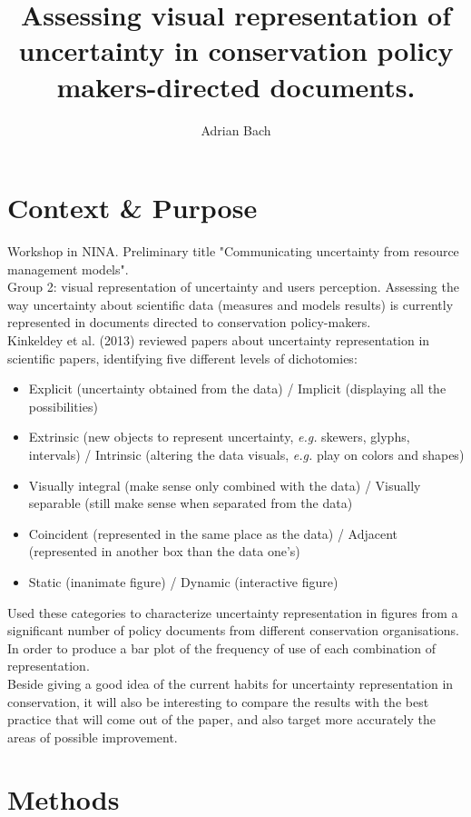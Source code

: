 \documentclass[12pt,a4paper]{article}
\author{Adrian Bach}
\title{Assessing visual representation of uncertainty in conservation policy makers-directed documents.}
\begin{document}
\maketitle

\tableofcontents

\section{Context \& Purpose}

Workshop in NINA.
Preliminary title "Communicating uncertainty from resource management models".\\
Group 2: visual representation of uncertainty and users perception.
Assessing the way uncertainty about scientific data (measures and models results) is currently represented in documents directed to conservation policy-makers.\\
Kinkeldey et al. (2013) reviewed papers about uncertainty representation in scientific papers, identifying five different levels of dichotomies:
\begin{itemize}
\item Explicit (uncertainty obtained from the data) / Implicit (displaying all the possibilities)
\item Extrinsic (new objects to represent uncertainty, \textit{e.g.} skewers, glyphs, intervals) / Intrinsic (altering the data visuals, \textit{e.g.} play on colors and shapes)
\item Visually integral (make sense only combined with the data) / Visually separable (still make sense when  separated from the data)
\item Coincident (represented in the same place as the data) / Adjacent (represented in another box than the data one's)
\item Static (inanimate figure) / Dynamic (interactive figure)
\end{itemize}
Used these categories to characterize uncertainty representation in figures from a significant number of policy documents from different conservation organisations.
In order to produce a bar plot of the frequency of use of each combination of representation.\\
Beside giving a good idea of the current habits for uncertainty representation in conservation, it will also be interesting to compare the results with the best practice that will come out of the paper, and also target more accurately the areas of possible improvement.

\section{Methods}
\end{document}
